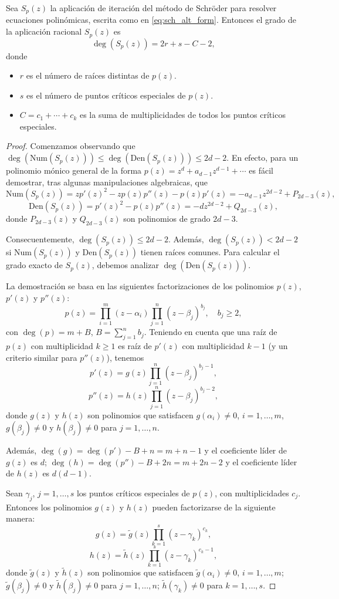 \begin{teorema}\label{teo:grado_schroder}
Sea $S_p(z)$ la aplicación de iteración del método de Schröder para resolver ecuaciones polinómicas, escrita como en \eqref{eq:sch_alt_form}. Entonces el grado de la aplicación racional $S_{p}(z)$ es
$$\deg(S_{p}(z)) =2r+s-C-2,$$
donde
\begin{itemize}
\item $r$ es el número de raíces distintas de $p(z)$.
\item $s$ es el número de puntos críticos especiales de $p(z)$.
\item $C=c_1+\cdots+c_k$ es la suma de multiplicidades de todos los puntos críticos especiales.
\end{itemize}
\end{teorema}

\begin{proof}
Comenzamos observando que $\deg(\text{Num}(S_p(z)))\le \deg(\text{Den}(S_p(z)))\le 2d-2$. En efecto, para un polinomio mónico general de la forma $p(z)=z^d +a_{d-1} z^{d-1} + \cdots$ es fácil demostrar, tras algunas manipulaciones algebraicas, que
$$ \text{Num}(S_p(z))=zp'(z)^2-zp(z)p''(z)-p(z)p'(z)=-a_{d-1}z^{2d-2}+P_{2d-3}(z), $$
$$ \text{Den}(S_p(z))=p'(z)^2-p(z)p''(z)=-dz^{2d-2}+Q_{2d-3}(z),$$
donde $P_{2d-3}(z)$ y $Q_{2d-3}(z)$ son polinomios de grado $2d-3$.

Consecuentemente, $\deg(S_p(z))\le 2d-2$. Además, $\deg(S_p(z))< 2d-2$ si $\text{Num}(S_p(z))$ y $\text{Den}(S_p(z))$ tienen raíces comunes. Para calcular el grado exacto de $S_p(z)$, debemos analizar $\deg(\text{Den}(S_p(z)))$.

La demostración se basa en las siguientes factorizaciones de los polinomios $p(z)$, $p'(z)$ y $p''(z)$:
\[
p(z)=\prod_{i=1}^m(z-\alpha_i)\prod_{j=1}^n(z-\beta_j)^{b_j},\quad b_j\ge 2,
\]
con $\deg(p)=m+B$, $B=\sum_{j=1}^n b_j.$ Teniendo en cuenta que una raíz de $p(z)$ con multiplicidad $k\ge 1$ es raíz de $p'(z)$ con multiplicidad $k-1$ (y un criterio similar para $p''(z)$), tenemos
$$p'(z)=g(z)\prod_{j=1}^n(z-\beta_j)^{b_j-1},$$
$$p''(z)=h(z)\prod_{j=1}^n(z-\beta_j)^{b_j-2},$$
donde $g(z)$ y $h(z)$ son polinomios que satisfacen $g(\alpha_i)\ne 0$, $i=1,\dots, m$, $g(\beta_j)\ne0$ y $h(\beta_j)\ne 0$ para $j=1,\dots, n$.

Además, $\deg(g)=\deg(p')-B+n=m+n-1$ y el coeficiente líder de $g(z)$ es $d$; $\deg(h)=\deg(p'')-B+2n=m+2n-2$ y el coeficiente líder de $h(z)$ es $d(d-1)$.

Sean $\gamma_j$, $j=1,\dots, s$ los puntos críticos especiales de $p(z)$, con multiplicidades $c_j$. Entonces los polinomios $g(z)$ y $h(z)$ pueden factorizarse de la siguiente manera:
$$g(z)=\tilde{g}(z)\prod_{k=1}^s(z-\gamma_k)^{c_k},$$
$$h(z)=\tilde{h}(z)\prod_{k=1}^s(z-\gamma_k)^{c_k-1},$$
donde $\tilde{g}(z)$ y $\tilde{h}(z)$ son polinomios que satisfacen $\tilde{g}(\alpha_i)\ne 0$, $i=1,\dots, m$; $\tilde{g}(\beta_j)\ne0$ y $\tilde{h}(\beta_j)\ne 0$ para $j=1,\dots, n$; $\tilde{h}(\gamma_k)\ne 0$ para $k=1,\dots, s$.


\end{proof}
